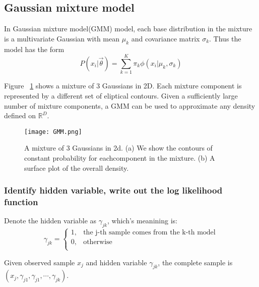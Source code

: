 \subsection{Gaussian mixture model}
\begin{definition}
In Gaussian mixture model(GMM) model, each base distribution in the mixture is a multivariate Gaussian with mean $\mu_k$ and covariance matrix $\sigma_k$. Thus the model has the form
\begin{equation}
P(x_i|\vec{\theta})=\sum\limits_{k=1}^K{\pi_k\phi(x_i|\mu_k,\sigma_k)}
\end{equation}
\end{definition}

Figure ~\ref{fig:GMM} shows a mixture of 3 Gaussians in 2D. Each mixture component is represented by a different set of eliptical contours. Given a sufficiently large number of mixture components, a GMM can be used to approximate any density defined on $\mathbb{R}^D$.

\begin{figure}[hbtp]
\centering
    \texttt{[image: GMM.png]}
\caption{A mixture of 3 Gaussians in 2d. (a) We show the contours of constant probability for eachcomponent in the mixture. (b) A surface plot of the overall density.}
\label{fig:GMM} 
\end{figure}


\subsubsection{Identify hidden variable, write out the log likelihood function}
Denote the hidden variable as $\gamma_{jk}$, which's meanining is:
\begin{equation}\nonumber
\gamma_{jk}=\begin{cases}
1, & \text{the j-th sample comes from the k-th model}\\
0, & \text{otherwise} \\
\end{cases}
\end{equation}

Given observed sample $x_j$ and hidden variable $\gamma_{jk}$, the complete sample is $(x_j,\gamma_{j1},\gamma_{j1},\cdots,\gamma_{jk})$.

